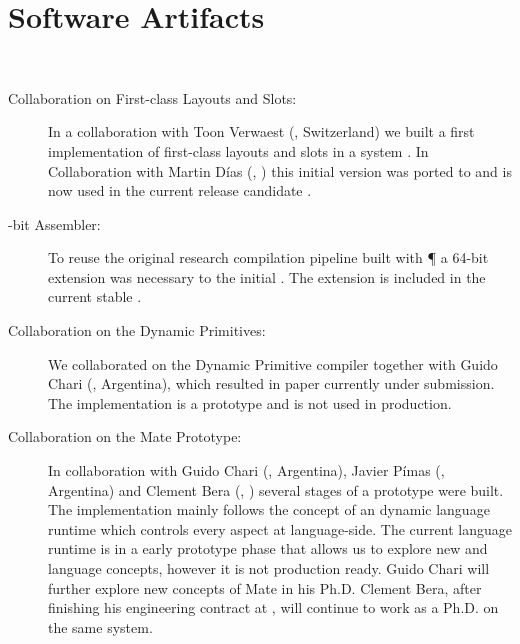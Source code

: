 \section{Software Artifacts}
 \\
\begin{description}
	\item[Collaboration on First-class Layouts and Slots:]
		In a collaboration with Toon Verwaest (\SCG, Switzerland) we built a first implementation of first-class layouts and slots in a \ST system \cite{Verw11a}.
		In Collaboration with Martin Días (\RMoD, \INRIA) this initial version was ported to \PH and is now used in the current release candidate .

	\item[-bit Assembler:]
		To reuse the original research compilation pipeline built with \P \cite{Verw10a, Brun11a} a 64-bit extension was necessary to the initial .
		The extension is included in the current stable .

	\item[Collaboration on the \WF Dynamic Primitives:]
		We collaborated on the \WF Dynamic Primitive compiler together with Guido Chari (\UBA, Argentina), which resulted in paper currently under submission\cite{Char13a}.
		The implementation is a prototype and is not used in production.

	\item[Collaboration on the Mate \VM Prototype:]
		In collaboration with Guido Chari (\UBA, Argentina), Javier Pímas (\UBA, Argentina) and Clement Bera (\RMoD, \INRIA) several stages of a prototype \VM were built.
		The implementation mainly follows the concept of an dynamic language runtime which controls every aspect at language-side.
		The current language runtime is in a early prototype phase that allows us to explore new \VM and language concepts, however it is not production ready.
		Guido Chari will further explore new concepts of Mate in his Ph.D.
		Clement Bera, after finishing his engineering contract at \RMoD, will continue to work as a Ph.D. on the same system.


\end{description}
